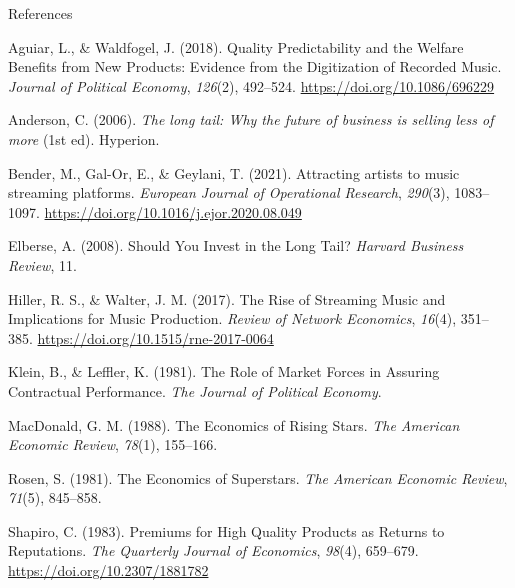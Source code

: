 \documentclass[
]{article}
\newlength{\cslhangindent}
\newlength{\cslentryspacingunit} %
\newenvironment{CSLReferences}[2] %
 {%
  \setlength{\parindent}{0pt}
  \ifodd #1
  \let\oldpar\par
  \def\par{\hangindent=\cslhangindent\oldpar}
  \fi
  \setlength{\parskip}{#2\cslentryspacingunit}
 }%
 {}
\begin{document}
\newpage

References

\hypertarget{refs}{}
\begin{CSLReferences}{1}{0}
\leavevmode{}%
Aguiar, L., \& Waldfogel, J. (2018). Quality {Predictability} and the
{Welfare Benefits} from {New Products}: {Evidence} from the
{Digitization} of {Recorded Music}. \emph{Journal of Political Economy},
\emph{126}(2), 492--524. \url{https://doi.org/10.1086/696229}

\leavevmode{}%
Anderson, C. (2006). \emph{The long tail: Why the future of business is
selling less of more} (1st ed). {Hyperion}.

\leavevmode{}%
Bender, M., Gal-Or, E., \& Geylani, T. (2021). Attracting artists to
music streaming platforms. \emph{European Journal of Operational
Research}, \emph{290}(3), 1083--1097.
\url{https://doi.org/10.1016/j.ejor.2020.08.049}

\leavevmode{}%
Elberse, A. (2008). Should {You Invest} in the {Long Tail}?
\emph{Harvard Business Review}, 11.

\leavevmode{}%
Hiller, R. S., \& Walter, J. M. (2017). The {Rise} of {Streaming Music}
and {Implications} for {Music Production}. \emph{Review of Network
Economics}, \emph{16}(4), 351--385.
\url{https://doi.org/10.1515/rne-2017-0064}

\leavevmode{}%
Klein, B., \& Leffler, K. (1981). The {Role} of {Market Forces} in
{Assuring Contractual Performance}. \emph{The Journal of Political
Economy}.

\leavevmode{}%
MacDonald, G. M. (1988). The {Economics} of {Rising Stars}. \emph{The
American Economic Review}, \emph{78}(1), 155--166.

\leavevmode{}%
Rosen, S. (1981). The {Economics} of {Superstars}. \emph{The American
Economic Review}, \emph{71}(5), 845--858.

\leavevmode{}%
Shapiro, C. (1983). Premiums for {High Quality Products} as {Returns} to
{Reputations}. \emph{The Quarterly Journal of Economics}, \emph{98}(4),
659--679. \url{https://doi.org/10.2307/1881782}


\end{CSLReferences}
\end{document}
